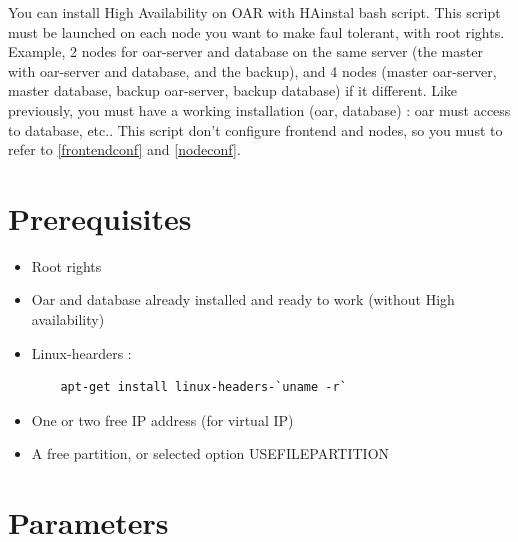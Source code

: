 \documentclass[a4paper,10pt]{report}
\begin{document}
You can install High Availability on OAR with HAinstal bash script. This script must be launched on each node you want to make faul tolerant, with root rights. Example, 2 nodes for oar-server and database on the same server (the master with oar-server and database, and the backup), and 4 nodes (master oar-server, master database, backup oar-server, backup database) if it different.
Like previously, you must have a working installation (oar, database) : oar must access to database, etc.. This script don't configure frontend and nodes, so you must to refer to \ref{frontendconf} and \ref{nodeconf}.

\section{Prerequisites}
\begin{itemize}
 \item Root rights
 \item Oar and database already installed and ready to work (without High availability)
 \item Linux-hearders : 
    \begin{lstlisting}
    apt-get install linux-headers-`uname -r`
    \end{lstlisting}
 \item One or two free IP address (for virtual IP)
 \item A free partition, or selected option USEFILEPARTITION
\end{itemize}


\section{Parameters}
\end{document}
